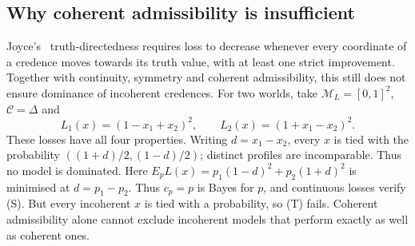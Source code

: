 \documentclass[11pt]{article}
\theoremstyle{definition}
\theoremstyle{remark}
\newcommand{\M}{\mathcal M}
\newcommand{\C}{\mathcal C}
\begin{document}
\subsection{Why coherent admissibility is insufficient}
Joyce's~\cite{Joyce2009} truth-directedness requires loss to decrease whenever every coordinate of a credence moves towards its truth value, with at least one strict improvement. Together with continuity, symmetry and coherent admissibility, this still does not ensure dominance of incoherent credences. For two worlds, take $\M_L=[0,1]^2$, $\C=\Delta$ and
\[
L_1(x)=(1-x_1+x_2)^2,\qquad L_2(x)=(1+x_1-x_2)^2.
\]
These losses have all four properties. Writing $d=x_1-x_2$, every $x$ is tied with the probability $((1+d)/2,(1-d)/2)$; distinct profiles are incomparable. Thus no model is dominated. Here $E_pL(x)=p_1(1-d)^2+p_2(1+d)^2$ is minimised at $d=p_1-p_2$. Thus $c_p=p$ is Bayes for $p$, and continuous losses verify (S). But every incoherent $x$ is tied with a probability, so (T) fails. Coherent admissibility alone cannot exclude incoherent models that perform exactly as well as coherent ones.
\end{document}
